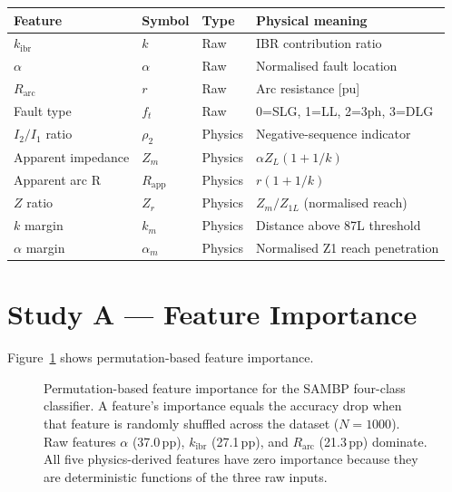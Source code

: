 \documentclass[11pt,a4paper]{article}
\begin{document}
\begin{center}
\begin{tabular}{@{}llll@{}}
\toprule
Feature & Symbol & Type & Physical meaning \\
\midrule
$k_\mathrm{ibr}$ & $k$ & Raw & IBR contribution ratio \\
$\alpha$ & $\alpha$ & Raw & Normalised fault location \\
$R_\mathrm{arc}$ & $r$ & Raw & Arc resistance [pu] \\
Fault type & $f_t$ & Raw & 0=SLG, 1=LL, 2=3\textrm{ph}, 3=DLG \\
$I_2/I_1$ ratio & $\rho_2$ & Physics & Negative-sequence indicator \\
Apparent impedance & $Z_m$ & Physics & $\alpha Z_L(1+1/k)$ \\
Apparent arc R & $R_\mathrm{app}$ & Physics & $r(1+1/k)$ \\
$Z$ ratio & $Z_r$ & Physics & $Z_m/Z_{1L}$ (normalised reach) \\
$k$ margin & $k_m$ & Physics & Distance above 87L threshold \\
$\alpha$ margin & $\alpha_m$ & Physics & Normalised Z1 reach penetration \\
\bottomrule
\end{tabular}
\end{center}

\section{Study A --- Feature Importance}
\label{sec:studyA}

Figure~\ref{fig:importance} shows permutation-based feature importance.

\begin{figure}[htbp]
  \centering
  \resizebox{0.96\textwidth}{!}{}
  \caption{Permutation-based feature importance for the SAMBP four-class
           classifier.  A feature's importance equals the accuracy drop when
           that feature is randomly shuffled across the dataset ($N=1000$).
           Raw features $\alpha$ (37.0\,pp), $k_\mathrm{ibr}$ (27.1\,pp),
           and $R_\mathrm{arc}$ (21.3\,pp) dominate.  All five
           physics-derived features have zero importance because they are
           deterministic functions of the three raw inputs.}
  \label{fig:importance}
\end{figure}
\end{document}

